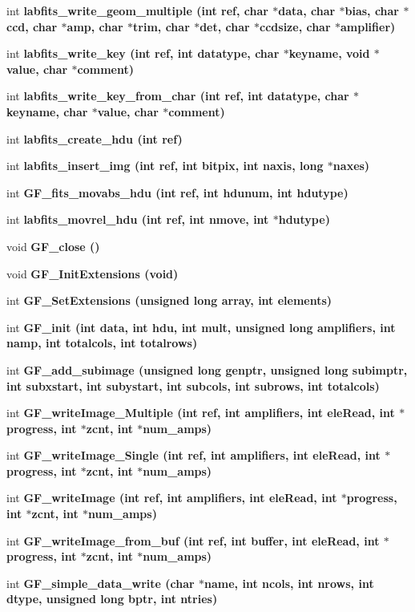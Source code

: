 \begin{CompactItemize}
int \bf{labfits\_\-write\_\-geom\_\-multiple} (int ref, char $\ast$data, char $\ast$bias, char $\ast$ccd, char $\ast$amp, char $\ast$trim, char $\ast$det, char $\ast$ccdsize, char $\ast$amplifier)
\item 
int \bf{labfits\_\-write\_\-key} (int ref, int \bf{datatype}, char $\ast$keyname, void $\ast$value, char $\ast$comment)
\item 
int \bf{labfits\_\-write\_\-key\_\-from\_\-char} (int ref, int \bf{datatype}, char $\ast$keyname, char $\ast$value, char $\ast$comment)
\item 
int \bf{labfits\_\-create\_\-hdu} (int ref)
\item 
int \bf{labfits\_\-insert\_\-img} (int ref, int bitpix, int naxis, long $\ast$naxes)
\item 
int \bf{GF\_\-fits\_\-movabs\_\-hdu} (int ref, int hdunum, int \bf{hdutype})
\item 
int \bf{labfits\_\-movrel\_\-hdu} (int ref, int nmove, int $\ast$\bf{hdutype})
\item 
void \bf{GF\_\-close} ()
\item 
void \bf{GF\_\-Init\-Extensions} (void)
\item 
int \bf{GF\_\-Set\-Extensions} (unsigned long array, int elements)
\item 
int \bf{GF\_\-init} (int data, int hdu, int mult, unsigned long amplifiers, int namp, int totalcols, int totalrows)
\item 
int \bf{GF\_\-add\_\-subimage} (unsigned long genptr, unsigned long subimptr, int subxstart, int subystart, int subcols, int subrows, int totalcols)
\item 
int \bf{GF\_\-write\-Image\_\-Multiple} (int ref, int amplifiers, int ele\-Read, int $\ast$progress, int $\ast$zcnt, int $\ast$num\_\-amps)
\item 
int \bf{GF\_\-write\-Image\_\-Single} (int ref, int amplifiers, int ele\-Read, int $\ast$progress, int $\ast$zcnt, int $\ast$num\_\-amps)
\item 
int \bf{GF\_\-write\-Image} (int ref, int amplifiers, int ele\-Read, int $\ast$progress, int $\ast$zcnt, int $\ast$num\_\-amps)
\item 
int \bf{GF\_\-write\-Image\_\-from\_\-buf} (int ref, int buffer, int ele\-Read, int $\ast$progress, int $\ast$zcnt, int $\ast$num\_\-amps)
\item 
int \bf{GF\_\-simple\_\-data\_\-write} (char $\ast$name, int ncols, int nrows, int dtype, unsigned long bptr, int ntries)
\end{CompactItemize}
